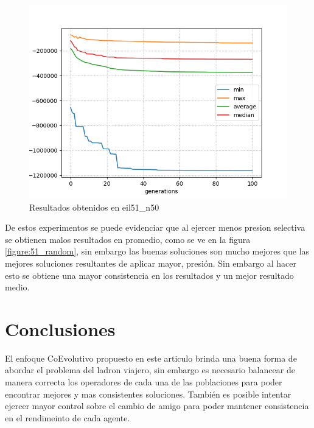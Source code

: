 \documentclass[twocolumn]{IEEEtran}
\begin{document}
\begin{figure}[htbp!]
    \centering
    \includegraphics[width=\linewidth]{figures/TTP_eil51_n50_tournament.png}
    \caption{Resultados obtenidos en eil51\_n50}
    \label{figure:51_torneum}
\end{figure}

De estos experimentos se puede evidenciar que al ejercer menos presion selectiva se obtienen
malos resultados en promedio, como se ve en la figura \ref{figure:51_random}, sin embargo las 
buenas soluciones son mucho mejores que las mejores soluciones resultantes de aplicar mayor,
presión. Sin embargo al hacer esto se obtiene una mayor consistencia en los resultados y un 
mejor resultado medio.

\section{Conclusiones}
El enfoque CoEvolutivo propuesto en este articulo brinda una buena forma de abordar el problema 
del ladron viajero, sin embargo es necesario balancear de manera correcta los operadores de cada
una de las poblaciones para poder encontrar mejores y mas consistentes soluciones. También es 
posible intentar ejercer mayor control sobre el cambio de amigo para poder mantener
consistencia en el rendimeinto de cada agente.


    
\end{document}
